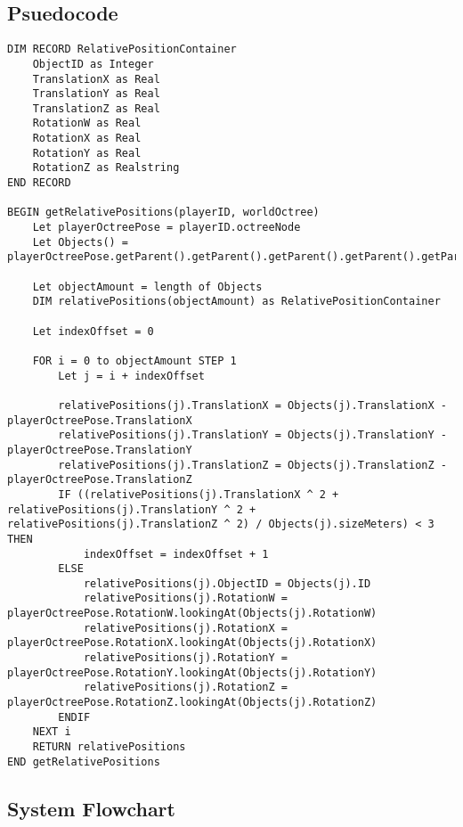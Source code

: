\documentclass[12pt, DIV=calc]{scrartcl}
\begin{document}
\subsection{Psuedocode}
\begin{verbatim}
DIM RECORD RelativePositionContainer
    ObjectID as Integer
    TranslationX as Real
    TranslationY as Real
    TranslationZ as Real
    RotationW as Real
    RotationX as Real
    RotationY as Real
    RotationZ as Realstring
END RECORD

BEGIN getRelativePositions(playerID, worldOctree)
    Let playerOctreePose = playerID.octreeNode
    Let Objects() = playerOctreePose.getParent().getParent().getParent().getParent().getParent().getParent().Objects

    Let objectAmount = length of Objects
    DIM relativePositions(objectAmount) as RelativePositionContainer

    Let indexOffset = 0

    FOR i = 0 to objectAmount STEP 1
        Let j = i + indexOffset

        relativePositions(j).TranslationX = Objects(j).TranslationX - playerOctreePose.TranslationX
        relativePositions(j).TranslationY = Objects(j).TranslationY - playerOctreePose.TranslationY
        relativePositions(j).TranslationZ = Objects(j).TranslationZ - playerOctreePose.TranslationZ
        IF ((relativePositions(j).TranslationX ^ 2 + relativePositions(j).TranslationY ^ 2 + relativePositions(j).TranslationZ ^ 2) / Objects(j).sizeMeters) < 3 THEN
            indexOffset = indexOffset + 1
        ELSE
            relativePositions(j).ObjectID = Objects(j).ID
            relativePositions(j).RotationW = playerOctreePose.RotationW.lookingAt(Objects(j).RotationW)   
            relativePositions(j).RotationX = playerOctreePose.RotationX.lookingAt(Objects(j).RotationX) 
            relativePositions(j).RotationY = playerOctreePose.RotationY.lookingAt(Objects(j).RotationY) 
            relativePositions(j).RotationZ = playerOctreePose.RotationZ.lookingAt(Objects(j).RotationZ) 
        ENDIF        
    NEXT i
    RETURN relativePositions
END getRelativePositions
\end{verbatim}

\subsection{System Flowchart}
\end{document}
